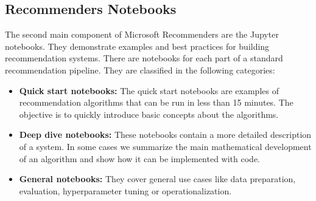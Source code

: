 \subsection{Recommenders Notebooks}

The second main component of Microsoft Recommenders are the Jupyter notebooks. 
They demonstrate examples and best practices for building recommendation systems.
There are notebooks for each part of a standard recommendation pipeline. They are
classified in the following categories:
\begin{itemize}
    \item \textbf{Quick start notebooks:} The quick start notebooks are examples of recommendation algorithms that 
    can be run in less than 15 minutes. The objective is to quickly introduce basic concepts about the algorithms.
    \item \textbf{Deep dive notebooks:} These notebooks contain a more detailed description of a system. In some cases
    we summarize the main mathematical development of an algorithm and show how it can be implemented with code.
    \item \textbf{General notebooks:} They cover general use cases like data preparation, evaluation, hyperparameter
    tuning or operationalization.
\end{itemize}

